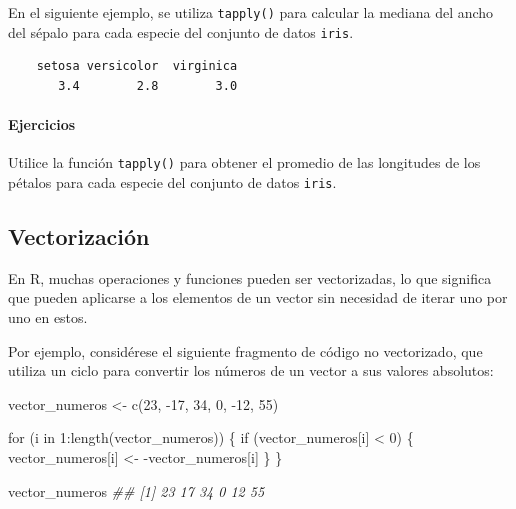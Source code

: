 \documentclass[
  letterpaper,
  DIV=11,
  numbers=noendperiod]{scrreprt}
\let\oldparagraph\paragraph
\renewcommand{\paragraph}[1]{\oldparagraph{#1}\mbox{}}
\newenvironment{Shaded}{\begin{snugshade}}{\end{snugshade}}
\newcommand{\ControlFlowTok}[1]{\textcolor[rgb]{0.00,0.23,0.31}{#1}}
\newcommand{\DecValTok}[1]{\textcolor[rgb]{0.68,0.00,0.00}{#1}}
\newcommand{\DocumentationTok}[1]{\textcolor[rgb]{0.37,0.37,0.37}{\textit{#1}}}
\newcommand{\FunctionTok}[1]{\textcolor[rgb]{0.28,0.35,0.67}{#1}}
\newcommand{\NormalTok}[1]{\textcolor[rgb]{0.00,0.23,0.31}{#1}}
\newcommand{\OtherTok}[1]{\textcolor[rgb]{0.00,0.23,0.31}{#1}}
\newcommand{\SpecialCharTok}[1]{\textcolor[rgb]{0.37,0.37,0.37}{#1}}
\begin{document}
En el siguiente ejemplo, se utiliza \texttt{tapply()} para calcular la
mediana del ancho del sépalo para cada especie del conjunto de datos
\texttt{iris}.

\begin{Shaded}
\end{Shaded}

\begin{verbatim}
    setosa versicolor  virginica 
       3.4        2.8        3.0 
\end{verbatim}

\hypertarget{ejercicios-10}{%
\paragraph{Ejercicios}\label{ejercicios-10}}

Utilice la función \texttt{tapply()} para obtener el promedio de las
longitudes de los pétalos para cada especie del conjunto de datos
\texttt{iris}.

\hypertarget{vectorizaciuxf3n}{%
\subsection{Vectorización}\label{vectorizaciuxf3n}}

En R, muchas operaciones y funciones pueden ser vectorizadas, lo que
significa que pueden aplicarse a los elementos de un vector sin
necesidad de iterar uno por uno en estos.

Por ejemplo, considérese el siguiente fragmento de código no
vectorizado, que utiliza un ciclo para convertir los números de un
vector a sus valores absolutos:

\begin{Shaded}
\begin{Highlighting}[]
\NormalTok{vector\_numeros }\OtherTok{\textless{}{-}} \FunctionTok{c}\NormalTok{(}\DecValTok{23}\NormalTok{, }\SpecialCharTok{{-}}\DecValTok{17}\NormalTok{, }\DecValTok{34}\NormalTok{, }\DecValTok{0}\NormalTok{, }\SpecialCharTok{{-}}\DecValTok{12}\NormalTok{, }\DecValTok{55}\NormalTok{)}

\ControlFlowTok{for}\NormalTok{ (i }\ControlFlowTok{in} \DecValTok{1}\SpecialCharTok{:}\FunctionTok{length}\NormalTok{(vector\_numeros)) \{}
  \ControlFlowTok{if}\NormalTok{ (vector\_numeros[i] }\SpecialCharTok{\textless{}} \DecValTok{0}\NormalTok{) \{}
\NormalTok{    vector\_numeros[i] }\OtherTok{\textless{}{-}} \SpecialCharTok{{-}}\NormalTok{vector\_numeros[i]}
\NormalTok{  \}}
\NormalTok{\}}

\NormalTok{vector\_numeros}
\DocumentationTok{\#\# [1] 23 17 34  0 12 55}
\end{Highlighting}
\end{Shaded}
\end{document}
